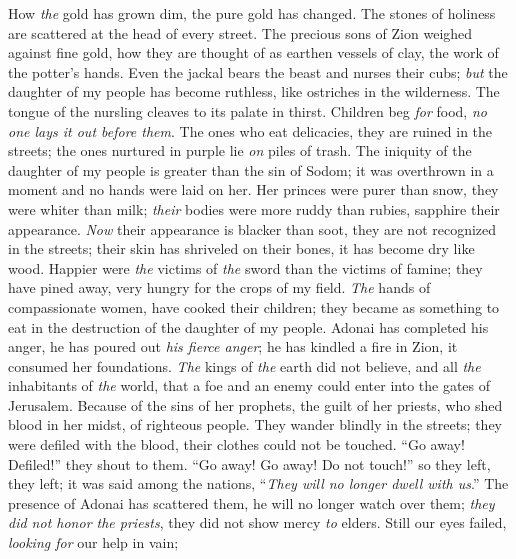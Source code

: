 \begin{biblechapter} %
 How \textit{the} gold has grown dim, 
the pure gold has changed. 
The stones of holiness are scattered 
at the head of every street.
\verse The precious sons of Zion 
weighed against fine gold, 
how they are thought of as earthen vessels of clay, 
the work of the potter’s hands.
\verse Even the jackal bears the beast 
and nurses their cubs; 
\textit{but} the daughter of my people has become ruthless, 
like ostriches in the wilderness.
\verse The tongue of the nursling cleaves 
to its palate in thirst. 
Children beg \textit{for} food, 
\textit{no one lays it out before them}.
\verse The ones who eat delicacies, 
they are ruined in the streets; 
the ones nurtured in purple 
lie \textit{on} piles of trash.
\verse The iniquity of the daughter of my people is greater 
than the sin of Sodom; 
it was overthrown in a moment 
and no hands were laid on her.
\verse Her princes were purer than snow, 
they were whiter than milk; 
\textit{their} bodies were more ruddy than rubies, 
sapphire their appearance.
\verse \textit{Now} their appearance is blacker than soot, 
they are not recognized in the streets; 
their skin has shriveled on their bones, 
it has become dry like wood.
\verse Happier were \textit{the} victims of \textit{the} sword 
than the victims of famine; 
they have pined away, very hungry 
for the crops of my field.
\verse \textit{The} hands of compassionate women, 
have cooked their children; 
they became as something to eat 
in the destruction of the daughter of my people.
\verse Adonai has completed his anger, 
he has poured out \textit{his fierce anger}; 
he has kindled a fire in Zion, 
it consumed her foundations.
\verse \textit{The} kings of \textit{the} earth did not believe, 
and all \textit{the} inhabitants of \textit{the} world, 
that a foe and an enemy could enter 
into the gates of Jerusalem.
\verse Because of the sins of her prophets, 
the guilt of her priests, 
who shed blood in her midst, 
of righteous people.
\verse They wander blindly in the streets; 
they were defiled with the blood, 
their clothes 
could not be touched.
\verse “Go away! Defiled!” they shout to them. 
“Go away! Go away! Do not touch!” 
so they left, they left; it was said among the nations, 
“\textit{They will no longer dwell with us}.”
\verse The presence of Adonai has scattered them, 
he will no longer watch over them; 
\textit{they did not honor the priests}, 
they did not show mercy \textit{to} elders.
\verse Still our eyes failed, 
\textit{looking for} our help in vain; 

\end{biblechapter}
